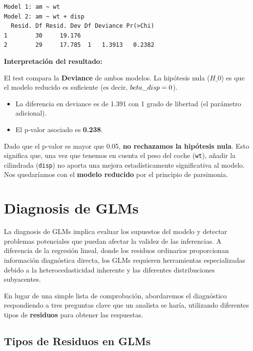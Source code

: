 \documentclass[
  letterpaper,
  DIV=11,
  numbers=noendperiod]{scrreprt}
\providecommand{\tightlist}{%
  \setlength{\itemsep}{0pt}\setlength{\parskip}{0pt}}
\begin{document}
\begin{tcolorbox}
\begin{verbatim}
Model 1: am ~ wt
Model 2: am ~ wt + disp
  Resid. Df Resid. Dev Df Deviance Pr(>Chi)
1        30     19.176                     
2        29     17.785  1   1.3913   0.2382
\end{verbatim}

\textbf{Interpretación del resultado:}

El test compara la \textbf{Deviance} de ambos modelos. La hipótesis nula
(\(H\_0\)) es que el modelo reducido es suficiente (es decir,
\(\\beta\_{disp} = 0\)).

\begin{itemize}
\tightlist
\item
  La diferencia en deviance es de 1.391 con 1 grado de libertad (el
  parámetro adicional).
\item
  El p-valor asociado es \textbf{0.238}.
\end{itemize}

Dado que el p-valor es mayor que 0.05, \textbf{no rechazamos la
hipótesis nula}. Esto significa que, una vez que tenemos en cuenta el
peso del coche (\texttt{wt}), añadir la cilindrada (\texttt{disp}) no
aporta una mejora estadísticamente significativa al modelo. Nos
quedaríamos con el \textbf{modelo reducido} por el principio de
parsimonia.

\end{tcolorbox}

\section{Diagnosis de GLMs}\label{diagnosis-de-glms}

La diagnosis de GLMs implica evaluar los supuestos del modelo y detectar
problemas potenciales que puedan afectar la validez de las inferencias.
A diferencia de la regresión lineal, donde los residuos ordinarios
proporcionan información diagnóstica directa, los GLMs requieren
herramientas especializadas debido a la heterocedasticidad inherente y
las diferentes distribuciones subyacentes.

En lugar de una simple lista de comprobación, abordaremos el diagnóstico
respondiendo a tres preguntas clave que un analista se haría, utilizando
diferentes tipos de \textbf{residuos} para obtener las respuestas.

\subsection{Tipos de Residuos en GLMs}\label{tipos-de-residuos-en-glms}
\end{document}

